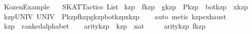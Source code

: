 %
\begin{isabellebody}%
\def\isabellecontext{Kozen{\isaliteral{5F}{\isacharunderscore}}Example}%
%
\isadelimtheory
%
\endisadelimtheory
%
\isatagtheory
{}\isamarkupfalse%
\ Kozen{}Example\isanewline
\ \ \ SKAT{}Tactics\ List\isanewline
{}%
\endisatagtheory
{\isafoldtheory}%
%
\isadelimtheory
\isanewline
%
\endisadelimtheory
\isanewline
\isanewline
\isanewline
{}\isamarkupfalse%
\ kzp\ {}\ f{}kzp\ {}\ g{}kzp\ {}\ P{}kzp\ {}\ bot{}kzp\ {}\ x{}kzp\isanewline
\isanewline
{}\isamarkupfalse%
\ kzp{}UNIV{}\ {}UNIV\ {}\ {}P{}kzp{}f{}kzp{}g{}kzp{}bot{}kzp{}x{}kzp{}{}\isanewline
%
\isadelimproof
\ \ %
\endisadelimproof
%
\isatagproof
{}\isamarkupfalse%
\ {}auto{}\ metis\ kzp{}exhaust{}%
\endisatagproof
{\isafoldproof}%
%
\isadelimproof
\isanewline
%
\endisadelimproof
\isanewline
{}\isamarkupfalse%
\ kzp\ {}{}\ ranked{}alphabet\isanewline
{}\isanewline
\isanewline
\ \ \isamarkupfalse%
\ arity{}kzp\ {}{}\ {}kzp\ {}\ nat{}\ \isanewline
\ \ \ \ {}arity{}kzp\ f{}kzp\ {}\ {}{}\isanewline

\end{isabellebody}
